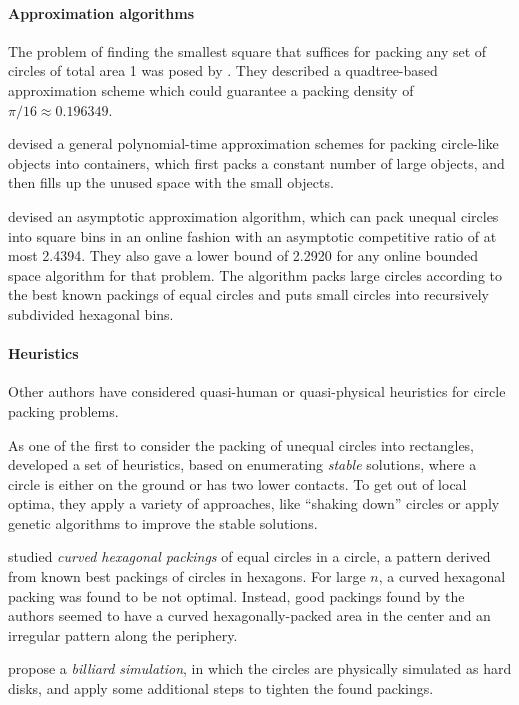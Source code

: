 \paragraph{Approximation algorithms}

The problem of finding the smallest square that suffices for packing any set of circles of total area 1 was posed by \textcite{DFL2010circle}. They described a quadtree-based approximation scheme which could guarantee a packing density of $\pi/16 \approx 0.196349$.

\textcite{MPSSW2014polynomial} devised a general polynomial-time approximation schemes for packing circle-like objects into containers, which first packs a constant number of large objects, and then fills up the unused space with the small objects.

\textcite{HMS2016bounded} devised an asymptotic approximation algorithm, which can pack unequal circles into square bins in an online fashion with an asymptotic competitive ratio of at most 2.4394. They also gave a lower bound of 2.2920 for any online bounded space algorithm for that problem. The algorithm packs large circles according to the best known packings of equal circles and puts small circles into recursively subdivided hexagonal bins.

\paragraph{Heuristics}

Other authors have considered quasi-human or quasi-physical heuristics for circle packing problems.

As one of the first to consider the packing of unequal circles into rectangles, \textcite{GGL1995packing} developed a set of heuristics, based on enumerating \emph{stable} solutions, where a circle is either on the ground or has two lower contacts. To get out of local optima, they apply a variety of approaches, like “shaking down” circles or apply genetic algorithms to improve the stable solutions.

\textcite{lubachevsky1997curved} studied \emph{curved hexagonal packings} of equal circles in a circle, a pattern derived from known best packings of circles in hexagons. For large $n$, a curved hexagonal packing was found to be not optimal. Instead, good packings found by the authors seemed to have a curved hexagonally-packed area in the center and an irregular pattern along the periphery.

\textcite{GLNO1998dense} propose a \emph{billiard simulation}, in which the circles are physically simulated as hard disks, and apply some additional steps to tighten the found packings.

